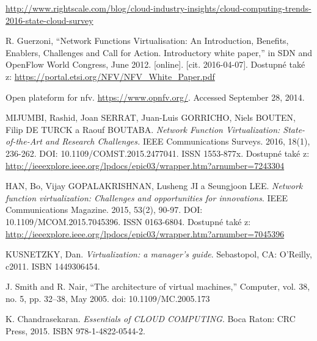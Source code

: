 
 \renewcommand{\appendixname}{Literatura}%

  
\begin{thebibliography}{10}

\url{http://www.rightscale.com/blog/cloud-industry-insights/cloud-computing-trends-2016-state-cloud-survey}

\url{}


R. Guerzoni, “Network Functions Virtualisation: An Introduction, Benefits, Enablers, Challenges and Call for Action. Introductory white paper,” in SDN and OpenFlow World Congress, June 2012. [online]. [cit. 2016-04-07]. Dostupné také z: \url{https://portal.etsi.org/NFV/NFV_White_Paper.pdf}


\bibitem{}

Open plateform for nfv. \url{https://www.opnfv.org/}.  Accessed September 28,
2014.

MIJUMBI, Rashid, Joan SERRAT, Juan-Luis GORRICHO, Niels BOUTEN, Filip DE TURCK a Raouf BOUTABA. \emph{Network Function Virtualization: State-of-the-Art and Research Challenges.} IEEE Communications Surveys. 2016, 18(1), 236-262. DOI: 10.1109/COMST.2015.2477041. ISSN 1553-877x. Dostupné také z: \url{http://ieeexplore.ieee.org/lpdocs/epic03/wrapper.htm?arnumber=7243304}

HAN, Bo, Vijay GOPALAKRISHNAN, Lusheng JI a Seungjoon LEE. \emph{Network function virtualization: Challenges and opportunities for innovations}. IEEE Communications Magazine. 2015, 53(2), 90-97. DOI: 10.1109/MCOM.2015.7045396. ISSN 0163-6804. Dostupné také z: \url{http://ieeexplore.ieee.org/lpdocs/epic03/wrapper.htm?arnumber=7045396}

KUSNETZKY, Dan. \emph{Virtualization: a manager's guide}. Sebastopol, CA: O'Reilly, c2011. ISBN 1449306454.

J. Smith and R. Nair, “The architecture of virtual machines,” Computer, vol. 38, no. 5, pp. 32–38, May 2005. doi: 10.1109/MC.2005.173

K. Chandrasekaran. \emph{Essentials of CLOUD COMPUTING}. Boca Raton: CRC Press, 2015. ISBN 978-1-4822-0544-2.


\end{thebibliography}
